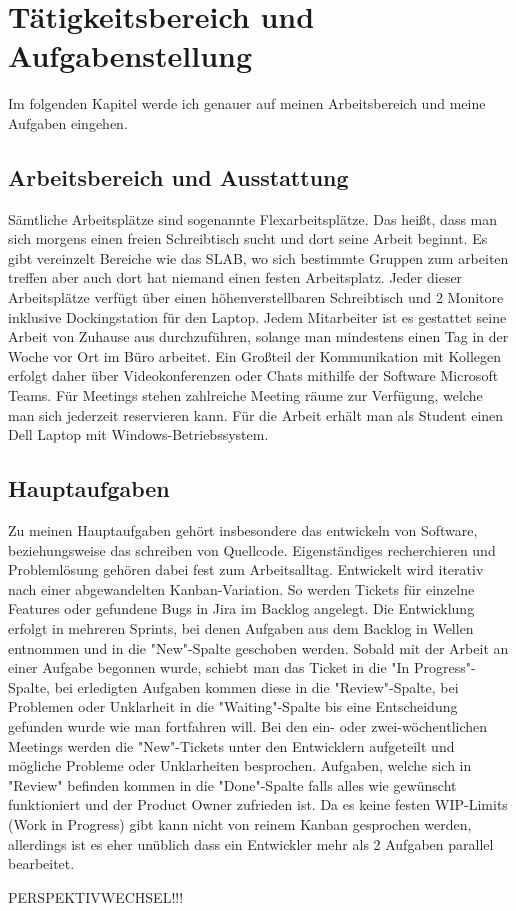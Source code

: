 \chapter{Tätigkeitsbereich und Aufgabenstellung}
Im folgenden Kapitel werde ich genauer auf meinen Arbeitsbereich und meine Aufgaben eingehen.

\section{Arbeitsbereich und Ausstattung}
Sämtliche Arbeitsplätze sind sogenannte Flexarbeitsplätze. Das heißt, dass man sich morgens einen freien Schreibtisch sucht und dort seine Arbeit beginnt. 
Es gibt vereinzelt Bereiche wie das SLAB, wo sich bestimmte Gruppen zum arbeiten treffen aber auch dort hat niemand einen festen Arbeitsplatz. 
Jeder dieser Arbeitsplätze verfügt über einen höhenverstellbaren Schreibtisch und 2 Monitore inklusive Dockingstation für den Laptop. 
Jedem Mitarbeiter ist es gestattet seine Arbeit von Zuhause aus durchzuführen, solange man mindestens einen Tag in der Woche vor Ort im Büro arbeitet. 
Ein Großteil der Kommunikation mit Kollegen erfolgt daher über Videokonferenzen oder Chats mithilfe der Software Microsoft Teams. 
Für Meetings stehen zahlreiche Meeting räume zur Verfügung, welche man sich jederzeit reservieren kann.
Für die Arbeit erhält man als Student einen Dell Laptop mit Windows-Betriebssystem. 

\section{Hauptaufgaben}
Zu meinen Hauptaufgaben gehört insbesondere das entwickeln von Software, beziehungsweise das schreiben von Quellcode. Eigenständiges recherchieren und Problemlösung gehören dabei fest zum Arbeitsalltag.
Entwickelt wird iterativ nach einer abgewandelten Kanban-Variation. So werden Tickets für einzelne Features oder gefundene Bugs in Jira im Backlog angelegt. Die Entwicklung erfolgt in mehreren Sprints,
bei denen Aufgaben aus dem Backlog in Wellen entnommen und in die "New"-Spalte geschoben werden. Sobald mit der Arbeit an einer Aufgabe begonnen wurde, schiebt man das Ticket in die "In Progress"-Spalte, 
bei erledigten Aufgaben kommen diese in die "Review"-Spalte, bei Problemen oder Unklarheit in die "Waiting"-Spalte bis eine Entscheidung gefunden wurde wie man fortfahren will.
Bei den ein- oder zwei-wöchentlichen Meetings werden die "New"-Tickets unter den Entwicklern aufgeteilt und mögliche Probleme oder Unklarheiten besprochen. Aufgaben, welche sich in "Review" befinden 
kommen in die "Done"-Spalte falls alles wie gewünscht funktioniert und der Product Owner zufrieden ist. Da es keine festen WIP-Limits (Work in Progress) gibt kann nicht von reinem Kanban gesprochen werden, 
allerdings ist es eher unüblich dass ein Entwickler mehr als 2 Aufgaben parallel bearbeitet.

PERSPEKTIVWECHSEL!!!